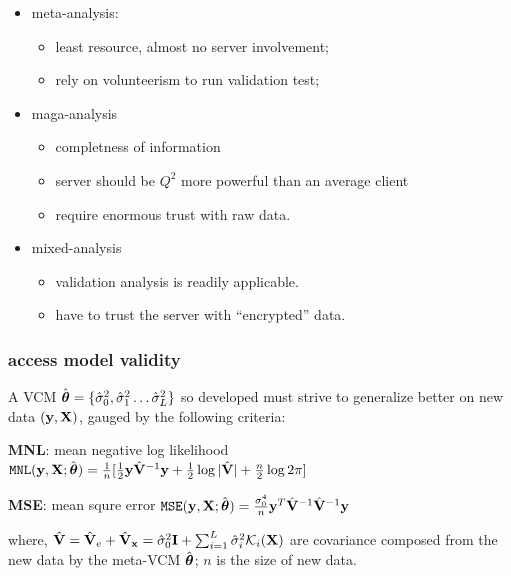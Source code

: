 \documentclass{beamer}
\begin{document}
\begin{frame}
  \begin{itemize}\frametitle{logistical concern, summarize}
  \item meta-analysis:
    \begin{itemize}
    \item least resource, almost no server involvement;
    \item rely on volunteerism to run validation test;
    \end{itemize}
  \item maga-analysis
    \begin{itemize}
    \item completness of information
    \item server should be $Q^2$ more powerful than an average client
    \item require enormous trust with raw data.
    \end{itemize}
  \item mixed-analysis
    \begin{itemize}
    \item validation analysis is readily applicable.
    \item have to trust the server with ``encrypted'' data.
    \end{itemize}
  \end{itemize}
\end{frame}
\begin{frame}\frametitle{access model validity}
  A VCM
  $\hat{\boldsymbol{\theta}}=\{\hat{\sigma}^2_0, \hat{\sigma}^2_1 \dots
  \hat{\sigma}^2_L\}$ so developed must strive to generalize better on
  new data $(\mathbf{y}, \mathbf{X})$, gauged by the following criteria:
  \begin{block}{\textbf{MNL}: mean negative log likelihood}
    $\mathtt{MNL}(\mathbf{y}, \mathbf{X}; \hat{\boldsymbol{\theta}}) = \frac{1}{n}
    [\frac{1}{2}\mathbf{y}\hat{\mathbf{V}}^{-1}\mathbf{y} + \frac{1}{2}\log{|\hat{\mathbf{V}}|} +
    \frac{n}{2}\log{2\pi}]$
  \end{block}
  \begin{block}{\textbf{MSE}: mean squre error}
    $\mathtt{MSE}(\mathbf{y}, \mathbf{X}; \hat{\boldsymbol{\theta}}) = \frac{\sigma_0^4}{n}
    \mathbf{y}^T\hat{\mathbf{V}}^{-1} \hat{\mathbf{V}}^{-1}\mathbf{y}$
  \end{block}
  where,
  $\hat{\mathbf{V}} = \hat{\mathbf{V}}_e + \hat{\mathbf{V}}_\mathbf{x} = \hat{\sigma}^2_0\textbf{I} +
  \sum_{i=1}^L\hat{\sigma}_i^2 \mathcal{K}_i(\mathbf{X})$ are covariance
  composed from the new data by the meta-VCM $\hat{\boldsymbol{\theta}}$; $n$
  is the size of new data.
\end{frame}
\end{document}

